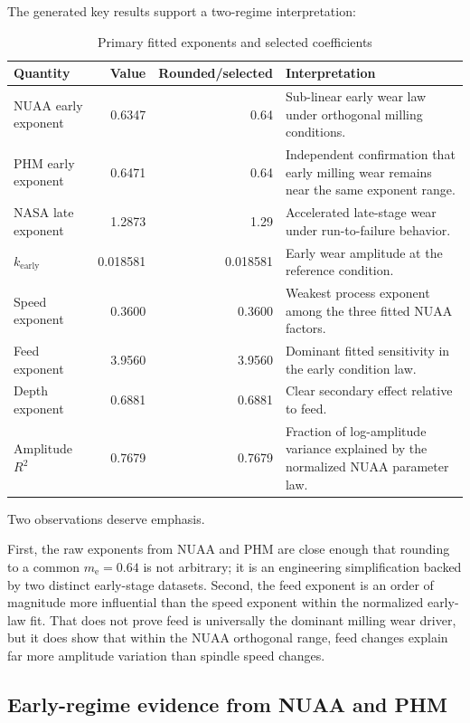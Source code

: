 \documentclass[11pt,a4paper]{article}
\newcommand{\earlyexp}{m_{\mathrm{e}}}
\begin{document}
The generated key results support a two-regime interpretation:

\begin{table}[H]
\centering
\caption{Primary fitted exponents and selected coefficients}
\begin{tabularx}{\textwidth}{>{\raggedright\arraybackslash}p{4.0cm}rrX}
\toprule
Quantity & Value & Rounded/selected & Interpretation \\
\midrule
NUAA early exponent & 0.6347 & 0.64 & Sub-linear early wear law under orthogonal milling conditions. \\
PHM early exponent & 0.6471 & 0.64 & Independent confirmation that early milling wear remains near the same exponent range. \\
NASA late exponent & 1.2873 & 1.29 & Accelerated late-stage wear under run-to-failure behavior. \\
\(k_{\mathrm{early}}\) & 0.018581 & 0.018581 & Early wear amplitude at the reference condition. \\
Speed exponent & 0.3600 & 0.3600 & Weakest process exponent among the three fitted NUAA factors. \\
Feed exponent & 3.9560 & 3.9560 & Dominant fitted sensitivity in the early condition law. \\
Depth exponent & 0.6881 & 0.6881 & Clear secondary effect relative to feed. \\
Amplitude \(R^2\) & 0.7679 & 0.7679 & Fraction of log-amplitude variance explained by the normalized NUAA parameter law. \\
\bottomrule
\end{tabularx}
\label{tab:key-results}
\end{table}

Two observations deserve emphasis.

First, the raw exponents from NUAA and PHM are close enough that rounding to a common \(\earlyexp = 0.64\) is
not arbitrary; it is an engineering simplification backed by two distinct early-stage datasets. Second, the feed exponent
is an order of magnitude more influential than the speed exponent within the normalized early-law fit. That does not
prove feed is universally the dominant milling wear driver, but it does show that within the NUAA orthogonal range,
feed changes explain far more amplitude variation than spindle speed changes.

\subsection{Early-regime evidence from NUAA and PHM}
\end{document}
